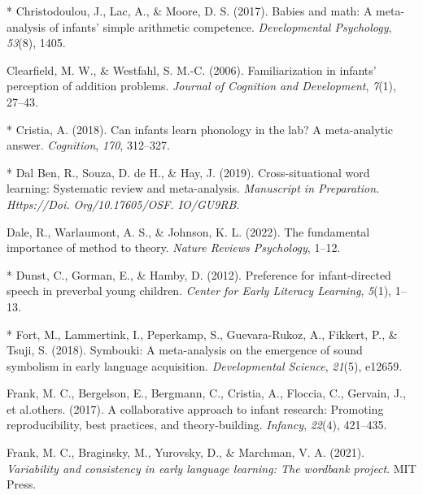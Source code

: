 \documentclass[10pt, letterpaper]{article}
\newenvironment{CSLReferences}%
  {}%
  {\par}
\begin{document}
\begin{CSLReferences}
\leavevmode{}%
* Christodoulou, J., Lac, A., \& Moore, D. S. (2017). Babies and math: A
meta-analysis of infants' simple arithmetic competence.
\emph{Developmental Psychology}, \emph{53}(8), 1405.

\leavevmode{}%
Clearfield, M. W., \& Westfahl, S. M.-C. (2006). Familiarization in
infants' perception of addition problems. \emph{Journal of Cognition and
Development}, \emph{7}(1), 27--43.

\leavevmode{}%
* Cristia, A. (2018). Can infants learn phonology in the lab? A
meta-analytic answer. \emph{Cognition}, \emph{170}, 312--327.

\leavevmode{}%
* Dal Ben, R., Souza, D. de H., \& Hay, J. (2019). Cross-situational
word learning: Systematic review and meta-analysis. \emph{Manuscript in
Preparation. Https://Doi. Org/10.17605/OSF. IO/GU9RB}.

\leavevmode{}%
Dale, R., Warlaumont, A. S., \& Johnson, K. L. (2022). The fundamental
importance of method to theory. \emph{Nature Reviews Psychology}, 1--12.

\leavevmode{}%
* Dunst, C., Gorman, E., \& Hamby, D. (2012). Preference for
infant-directed speech in preverbal young children. \emph{Center for
Early Literacy Learning}, \emph{5}(1), 1--13.

\leavevmode{}%
* Fort, M., Lammertink, I., Peperkamp, S., Guevara-Rukoz, A., Fikkert,
P., \& Tsuji, S. (2018). Symbouki: A meta-analysis on the emergence of
sound symbolism in early language acquisition. \emph{Developmental
Science}, \emph{21}(5), e12659.

\leavevmode{}%
Frank, M. C., Bergelson, E., Bergmann, C., Cristia, A., Floccia, C.,
Gervain, J., et al.others. (2017). A collaborative approach to infant
research: Promoting reproducibility, best practices, and
theory-building. \emph{Infancy}, \emph{22}(4), 421--435.

\leavevmode{}%
Frank, M. C., Braginsky, M., Yurovsky, D., \& Marchman, V. A. (2021).
\emph{Variability and consistency in early language learning: The
wordbank project}. MIT Press.


\end{CSLReferences}
\end{document}
